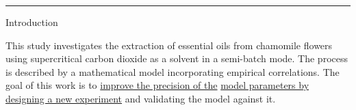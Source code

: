 \documentclass[a0,portrait]{a0poster}
\begin{document}
\vspace{-2cm} %
\noindent\rule{\textwidth}{3pt}


\begin{multicols}{2} %







\begin{tcolorbox}[width=\linewidth, boxrule=0mm, sharp corners=all, colback=white]
	{\LARGE Introduction\\}

This study investigates the extraction of essential oils from chamomile flowers using supercritical carbon dioxide as a solvent in a semi-batch mode. The process is described by a mathematical model incorporating empirical correlations. The goal of this work is to \underline{improve the precision of the} \underline{model parameters by designing a new experiment} and validating the model against it.
\end{tcolorbox}





\end{multicols}
\end{document}
